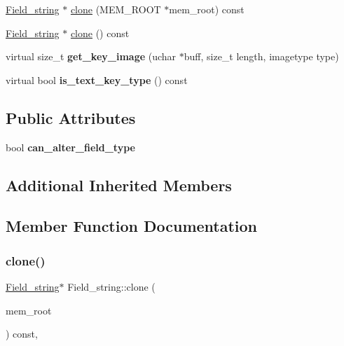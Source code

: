\begin{DoxyCompactItemize}
\item 
\mbox{\hyperlink{classField__string}{Field\+\_\+string}} $\ast$ \mbox{\hyperlink{classField__string_ab6707f46310451d7eceaaab26bc7dfe0}{clone}} (M\+E\+M\+\_\+\+R\+O\+OT $\ast$mem\+\_\+root) const
\item 
\mbox{\hyperlink{classField__string}{Field\+\_\+string}} $\ast$ \mbox{\hyperlink{classField__string_afeb8a339d94887f12168ab9ffa12ff33}{clone}} () const
\item 
\mbox{\label{classField__string_a475448f69355525e3b66ffffbf4ac54f}} 
virtual size\+\_\+t {\bfseries get\+\_\+key\+\_\+image} (uchar $\ast$buff, size\+\_\+t length, imagetype type)
\item 
\mbox{\label{classField__string_ad34fee226dfd12de70573793b609b799}} 
virtual bool {\bfseries is\+\_\+text\+\_\+key\+\_\+type} () const
\end{DoxyCompactItemize}
\subsection*{Public Attributes}
\begin{DoxyCompactItemize}
\item 
\mbox{\label{classField__string_ad9afee7ee1b5ccc418b7e53d55312853}} 
bool {\bfseries can\+\_\+alter\+\_\+field\+\_\+type}
\end{DoxyCompactItemize}
\subsection*{Additional Inherited Members}


\subsection{Member Function Documentation}
\mbox{\label{classField__string_ab6707f46310451d7eceaaab26bc7dfe0}} 
\subsubsection{\texorpdfstring{clone()}{clone()}\hspace{0.1cm}{\footnotesize\ttfamily [1/2]}}
{\footnotesize\ttfamily \mbox{\hyperlink{classField__string}{Field\+\_\+string}}$\ast$ Field\+\_\+string\+::clone (\begin{DoxyParamCaption}\item[{M\+E\+M\+\_\+\+R\+O\+OT $\ast$}]{mem\+\_\+root }\end{DoxyParamCaption}) const\hspace{0.3cm}{\ttfamily [inline]}, {\ttfamily [virtual]}}


